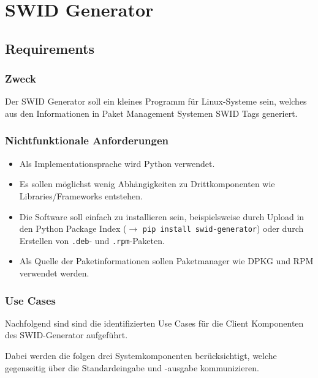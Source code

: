 \chapter{SWID Generator}


\section{Requirements}

\subsection{Zweck}

Der SWID Generator soll ein kleines Programm für Linux-Systeme sein, welches aus
den Informationen in Paket Management Systemen SWID Tags generiert.

\subsection{Nichtfunktionale Anforderungen}

\begin{itemize}
		\item Als Implementationsprache wird Python verwendet.
		\item Es sollen möglichst wenig Abhängigkeiten zu Drittkomponenten wie
			Libraries/Frameworks entstehen.
		\item Die Software soll einfach zu installieren sein, beispielsweise durch
			Upload in den Python Package Index ($\rightarrow$ \texttt{pip install
			swid-generator}) oder durch Erstellen von \texttt{.deb}- und
			\texttt{.rpm}-Paketen.
		\item Als Quelle der Paketinformationen sollen Paketmanager wie DPKG und RPM
			verwendet werden.
\end{itemize}

\subsection{Use Cases}

Nachfolgend sind sind die identifizierten Use Cases für die Client Komponenten
des SWID-Generator aufgeführt.

Dabei werden die folgen drei Systemkomponenten berücksichtigt, welche
gegenseitig über die Standardeingabe und -ausgabe kommunizieren.

\vspace{1em}

